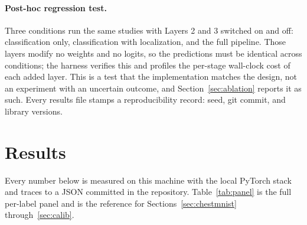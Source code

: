 \documentclass[10pt,twocolumn]{article}
\begin{document}
\paragraph{Post-hoc regression test.} Three conditions run the same studies with
Layers 2 and 3 switched on and off: classification only, classification with
localization, and the full pipeline. Those layers modify no weights and no logits,
so the predictions must be identical across conditions; the harness verifies this
and profiles the per-stage wall-clock cost of each added layer. This is a test
that the implementation matches the design, not an experiment with an uncertain
outcome, and Section~\ref{sec:ablation} reports it as such. Every results file
stamps a reproducibility record: seed, git commit, and library versions.

\section{Results}
\label{sec:results}

Every number below is measured on this machine with the local PyTorch stack and
traces to a JSON committed in the repository. Table~\ref{tab:panel} is the full
per-label panel and is the reference for Sections~\ref{sec:chestmnist}
through~\ref{sec:calib}.
\end{document}

